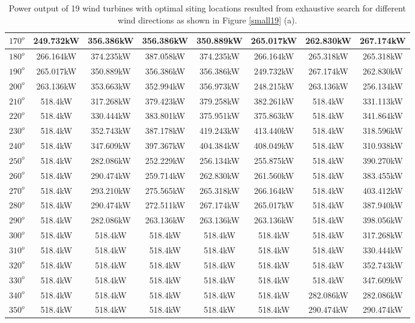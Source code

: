 \begin{table}[H]
\begin{tabular}{|c|c|c|c|c|c|c|c|}
		$170^o$	& 249.732kW	& 356.386kW	& 356.386kW	& 350.889kW	& 265.017kW	& 262.830kW	& 267.174kW	\\ \hline
		$180^o$	& 266.164kW	& 374.235kW	& 387.058kW	& 374.235kW	& 266.164kW	& 265.318kW	& 265.318kW	\\ \hline
		$190^o$	& 265.017kW	& 350.889kW	& 356.386kW	& 356.386kW	& 249.732kW	& 267.174kW	& 262.830kW	\\ \hline
		$200^o$	& 263.136kW	& 353.663kW	& 352.994kW	& 356.973kW	& 248.215kW	& 263.136kW	& 256.134kW	\\ \hline
		$210^o$	& 518.4kW	& 317.268kW	& 379.423kW	& 379.258kW	& 382.261kW	& 518.4kW	& 331.113kW	\\ \hline
		$220^o$	& 518.4kW	& 330.444kW	& 383.801kW	& 375.951kW	& 375.863kW	& 518.4kW	& 341.864kW	\\ \hline
		$230^o$	& 518.4kW	& 352.743kW	& 387.178kW	& 419.243kW	& 413.440kW	& 518.4kW	& 318.596kW	\\ \hline
		$240^o$	& 518.4kW	& 347.609kW	& 397.367kW	& 404.384kW	& 408.049kW	& 518.4kW	& 310.938kW	\\ \hline
		$250^o$	& 518.4kW	& 282.086kW	& 252.229kW	& 256.134kW	& 255.875kW	& 518.4kW	& 390.270kW	\\ \hline
		$260^o$	& 518.4kW	& 290.474kW	& 259.714kW	& 262.830kW	& 261.560kW	& 518.4kW	& 383.455kW	\\ \hline
		$270^o$	& 518.4kW	& 293.210kW	& 275.565kW	& 265.318kW	& 266.164kW	& 518.4kW	& 403.412kW	\\ \hline
		$280^o$	& 518.4kW	& 290.474kW	& 272.511kW	& 267.174kW	& 265.017kW	& 518.4kW	& 387.940kW	\\ \hline
		$290^o$	& 518.4kW	& 282.086kW	& 263.136kW	& 263.136kW	& 263.136kW	& 518.4kW	& 398.056kW	\\ \hline
		$300^o$	& 518.4kW	& 518.4kW	& 518.4kW	& 518.4kW	& 518.4kW	& 518.4kW	& 317.268kW	\\ \hline
		$310^o$	& 518.4kW	& 518.4kW	& 518.4kW	& 518.4kW	& 518.4kW	& 518.4kW	& 330.444kW	\\ \hline
		$320^o$	& 518.4kW	& 518.4kW	& 518.4kW	& 518.4kW	& 518.4kW	& 518.4kW	& 352.743kW	\\ \hline
		$330^o$	& 518.4kW	& 518.4kW	& 518.4kW	& 518.4kW	& 518.4kW	& 518.4kW	& 347.609kW	\\ \hline
		$340^o$	& 518.4kW	& 518.4kW	& 518.4kW	& 518.4kW	& 518.4kW	& 282.086kW	& 282.086kW	\\ \hline
		$350^o$	& 518.4kW	& 518.4kW	& 518.4kW	& 518.4kW	& 518.4kW	& 290.474kW	& 290.474kW	\\ \hline
        	\end{tabular}
        	\caption{Power output of 19 wind turbines with optimal siting locations resulted from exhaustive search for different wind directions as shown in Figure \ref{small19} (a).}
        	\label{table19a}
        \end{table}

